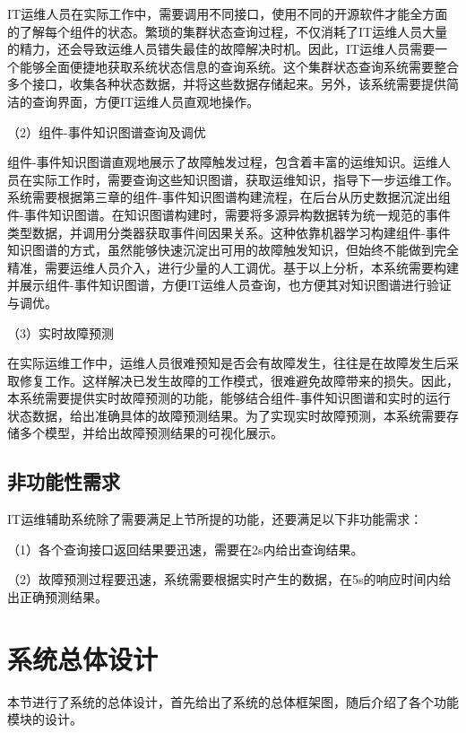 IT运维人员在实际工作中，需要调用不同接口，使用不同的开源软件才能全方面的了解每个组件的状态。繁琐的集群状态查询过程，不仅消耗了IT运维人员大量的精力，还会导致运维人员错失最佳的故障解决时机。因此，IT运维人员需要一个能够全面便捷地获取系统状态信息的查询系统。这个集群状态查询系统需要整合多个接口，收集各种状态数据，并将这些数据存储起来。另外，该系统需要提供简洁的查询界面，方便IT运维人员直观地操作。

（2）组件-事件知识图谱查询及调优

组件-事件知识图谱直观地展示了故障触发过程，包含着丰富的运维知识。运维人员在实际工作时，需要查询这些知识图谱，获取运维知识，指导下一步运维工作。系统需要根据第三章的组件-事件知识图谱构建流程，在后台从历史数据沉淀出组件-事件知识图谱。在知识图谱构建时，需要将多源异构数据转为统一规范的事件类型数据，并调用分类器获取事件间因果关系。这种依靠机器学习构建组件-事件知识图谱的方式，虽然能够快速沉淀出可用的故障触发知识，但始终不能做到完全精准，需要运维人员介入，进行少量的人工调优。基于以上分析，本系统需要构建并展示组件-事件知识图谱，方便IT运维人员查询，也方便其对知识图谱进行验证与调优。

（3）实时故障预测

在实际运维工作中，运维人员很难预知是否会有故障发生，往往是在故障发生后采取修复工作。这样解决已发生故障的工作模式，很难避免故障带来的损失。因此，本系统需要提供实时故障预测的功能，能够结合组件-事件知识图谱和实时的运行状态数据，给出准确具体的故障预测结果。为了实现实时故障预测，本系统需要存储多个模型，并给出故障预测结果的可视化展示。


\subsection{非功能性需求}
IT运维辅助系统除了需要满足上节所提的功能，还要满足以下非功能需求：

（1）各个查询接口返回结果要迅速，需要在2s内给出查询结果。

（2）故障预测过程要迅速，系统需要根据实时产生的数据，在5s的响应时间内给出正确预测结果。


\section{系统总体设计}
本节进行了系统的总体设计，首先给出了系统的总体框架图，随后介绍了各个功能模块的设计。
